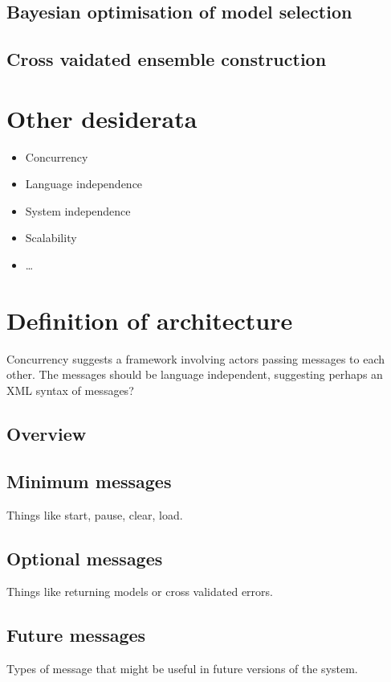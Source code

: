 \documentclass[twoside,11pt]{article}
\begin{document}
\subsection{Bayesian optimisation of model selection}

\subsection{Cross vaidated ensemble construction}

\section{Other desiderata}

\begin{itemize}
  \item Concurrency
  \item Language independence
  \item System independence
  \item Scalability
  \item \dots
\end{itemize}

\section{Definition of architecture}

Concurrency suggests a framework involving actors passing messages to each other.
The messages should be language independent, suggesting perhaps an XML syntax of messages?

\subsection{Overview}

\subsection{Minimum messages}

Things like start, pause, clear, load.

\subsection{Optional messages}

Things like returning models or cross validated errors.

\subsection{Future messages}

Types of message that might be useful in future versions of the system. 

\newpage


\vskip 0.2in

\end{document}

